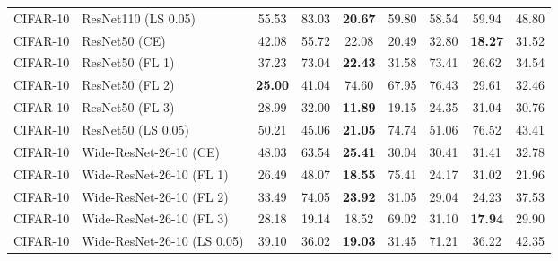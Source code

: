 \begin{table}[h!]
{\begin{tabular}{llccccccc}
    CIFAR-10 &         ResNet110 (LS 0.05) &                  55.53 &        83.03 & \textbf{20.67} &                  59.80 &                  58.54 &                  59.94 &                  48.80 \\
    CIFAR-10 &               ResNet50 (CE) &                  42.08 &        55.72 &                  22.08 &                  20.49 &                  32.80 & \textbf{18.27} &                  31.52 \\
    CIFAR-10 &             ResNet50 (FL 1) &                  37.23 &        73.04 & \textbf{22.43} &                  31.58 &                  73.41 &                  26.62 &                  34.54 \\
    CIFAR-10 &             ResNet50 (FL 2) & \textbf{25.00} &        41.04 &                  74.60 &                  67.95 &                  76.43 &                  29.61 &                  32.46 \\
    CIFAR-10 &             ResNet50 (FL 3) &                  28.99 &        32.00 & \textbf{11.89} &                  19.15 &                  24.35 &                  31.04 &                  30.76 \\
    CIFAR-10 &          ResNet50 (LS 0.05) &                  50.21 &        45.06 & \textbf{21.05} &                  74.74 &                  51.06 &                  76.52 &                  43.41 \\
    CIFAR-10 &      Wide-ResNet-26-10 (CE) &                  48.03 &        63.54 & \textbf{25.41} &                  30.04 &                  30.41 &                  31.41 &                  32.78 \\
    CIFAR-10 &    Wide-ResNet-26-10 (FL 1) &                  26.49 &        48.07 & \textbf{18.55} &                  75.41 &                  24.17 &                  31.02 &                  21.96 \\
    CIFAR-10 &    Wide-ResNet-26-10 (FL 2) &                  33.49 &        74.05 & \textbf{23.92} &                  31.05 &                  29.04 &                  24.23 &                  37.53 \\
    CIFAR-10 &    Wide-ResNet-26-10 (FL 3) &                  28.18 &        19.14 &                  18.52 &                  69.02 &                  31.10 & \textbf{17.94} &                  29.90 \\
    CIFAR-10 & Wide-ResNet-26-10 (LS 0.05) &                  39.10 &        36.02 & \textbf{19.03} &                  31.45 &                  71.21 &                  36.22 &                  42.35 \\

\end{tabular}}
\end{table}
